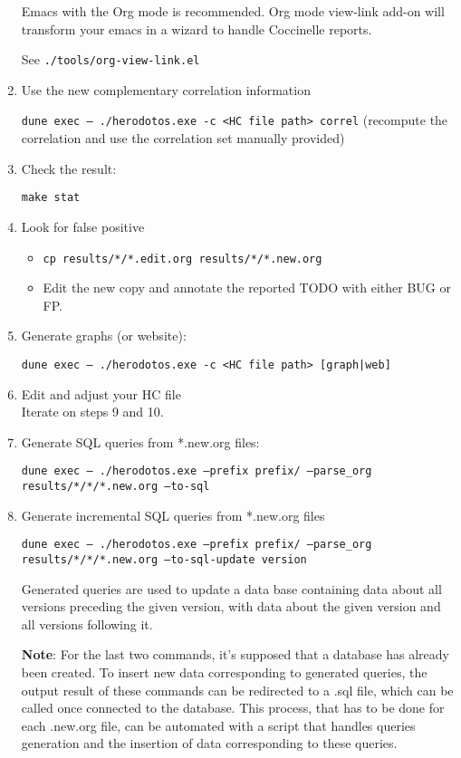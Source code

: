 \begin{enumerate}
  Emacs with the Org mode is recommended.
  Org mode view-link add-on will transform your
  emacs in a wizard to handle Coccinelle reports.

  See \texttt{./tools/org-view-link.el}

\item Use the new complementary correlation information

  \texttt{dune exec -- ./herodotos.exe -c <HC file path> correl} (recompute the correlation and use the
  correlation set manually provided)

\item Check the result:

  \texttt{make stat}

\item Look for false positive

  \begin{itemize}
  \item \texttt{cp results/*/*.edit.org results/*/*.new.org}
  \item Edit the new copy and annotate the reported TODO with either
    BUG or FP.
  \end{itemize}

\item Generate graphs (or website):

  \texttt{dune exec -- ./herodotos.exe -c <HC file path> [graph|web]}

\item Edit and adjust your HC file\\

  Iterate on steps 9 and 10.

\item Generate SQL queries from *.new.org files:
  
  \texttt{dune exec -- ./herodotos.exe  ---prefix prefix/ ---parse\_org results/*/*/*.new.org ---to-sql}
  
\item Generate incremental SQL queries from *.new.org files

  \texttt{dune exec -- ./herodotos.exe  ---prefix prefix/ ---parse\_org results/*/*/*.new.org ---to-sql-update version}
  
  Generated queries are used to update a data base containing data
  about all versions preceding the given version, with data about the
  given version and all versions following it.
  
  \textbf{Note}: For the last two commands, it's supposed that a
  database has already been created. To insert new data corresponding
  to generated queries, the output result of these commands can be
  redirected to a .sql file, which can be called once connected to the
  database. This process, that has to be done for each .new.org file,
  can be automated with a script that handles queries generation and
  the insertion of data corresponding to these queries.
\end{enumerate}



